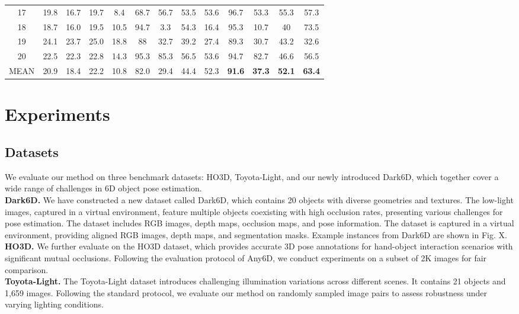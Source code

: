\documentclass[letterpaper, 10 pt, journal, twoside]{IEEEtran}  %
\begin{document}
\begin{table}[ht]
{\begin{tabular}{c|cccc|cccc|cccc}
			17 & 19.8 & 16.7 & 19.7 & 8.4  & 68.7 & 56.7 & 53.5 & 53.6 & 96.7 & 53.3 & 55.3 & 57.3 \\
			18 & 18.7 & 16.0 & 19.5 & 10.5 & 94.7 & 3.3  & 54.3 & 16.4 & 95.3 & 10.7 & 40   & 73.5 \\
			19 & 24.1 & 23.7 & 25.0 & 18.8 & 88   & 32.7 & 39.2 & 27.4 & 89.3 & 30.7 & 43.2 & 32.6 \\
			20 & 22.5 & 22.3 & 22.8 & 14.3 & 95.3 & 85.3 & 56.5 & 53.6 & 94.7 & 82.7 & 46.6 & 56.5 \\
			\hline
			MEAN & 20.9 & 18.4 & 22.2 & 10.8 & 82.0 & 29.4 & 44.4 & 52.3 & \textbf{91.6} & \textbf{37.3} & \textbf{52.1} & \textbf{63.4} \\
			\hline
		\end{tabular}
	}
	\label{tab:results}
\end{table}
\section{Experiments}
\subsection{Datasets}
We evaluate our method on three benchmark datasets: HO3D, Toyota-Light, and our newly introduced Dark6D, which together cover a wide range of challenges in 6D object pose estimation.
\\ \textbf{Dark6D.}     We have constructed a new dataset called Dark6D, which contains 20 objects with diverse geometries and textures. The low-light images, captured in a virtual environment, feature multiple objects coexisting with high occlusion rates, presenting various challenges for pose estimation. The dataset includes RGB images, depth maps, occlusion maps, and pose information.
The dataset is captured in a virtual environment, providing aligned RGB images, depth maps, and segmentation masks. Example instances from Dark6D are shown in Fig. X.
\\ \textbf{HO3D}\cite{hampali2020honnotate}\textbf{.}     We further evaluate on the HO3D dataset, which provides accurate 3D pose annotations for hand-object interaction scenarios with significant mutual occlusions. Following the evaluation protocol of Any6D\cite{lee2025any6d}, we conduct experiments on a subset of 2K images for fair comparison.
\\ \textbf{Toyota-Light}\cite{hodan2018bop}\textbf{.}  The Toyota-Light dataset introduces challenging illumination variations across different scenes. It contains 21 objects and 1,659 images. Following the standard protocol, we evaluate our method on randomly sampled image pairs to assess robustness under varying lighting conditions.
\end{document}
